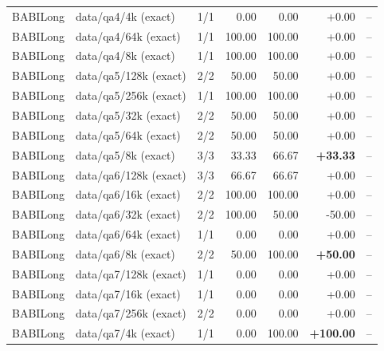 \begin{longtable}{lp{3.1cm}rrrrr}
BABILong & \raggedright data/\allowbreak qa4/\allowbreak 4k {\tiny (exact)} & 1/1 & 0.00 & 0.00 & +0.00 & -- \\
BABILong & \raggedright data/\allowbreak qa4/\allowbreak 64k {\tiny (exact)} & 1/1 & 100.00 & 100.00 & +0.00 & -- \\
BABILong & \raggedright data/\allowbreak qa4/\allowbreak 8k {\tiny (exact)} & 1/1 & 100.00 & 100.00 & +0.00 & -- \\
BABILong & \raggedright data/\allowbreak qa5/\allowbreak 128k {\tiny (exact)} & 2/2 & 50.00 & 50.00 & +0.00 & -- \\
BABILong & \raggedright data/\allowbreak qa5/\allowbreak 256k {\tiny (exact)} & 1/1 & 100.00 & 100.00 & +0.00 & -- \\
BABILong & \raggedright data/\allowbreak qa5/\allowbreak 32k {\tiny (exact)} & 2/2 & 50.00 & 50.00 & +0.00 & -- \\
BABILong & \raggedright data/\allowbreak qa5/\allowbreak 64k {\tiny (exact)} & 2/2 & 50.00 & 50.00 & +0.00 & -- \\
BABILong & \raggedright data/\allowbreak qa5/\allowbreak 8k {\tiny (exact)} & 3/3 & 33.33 & 66.67 & \textbf{+33.33} & -- \\
BABILong & \raggedright data/\allowbreak qa6/\allowbreak 128k {\tiny (exact)} & 3/3 & 66.67 & 66.67 & +0.00 & -- \\
BABILong & \raggedright data/\allowbreak qa6/\allowbreak 16k {\tiny (exact)} & 2/2 & 100.00 & 100.00 & +0.00 & -- \\
BABILong & \raggedright data/\allowbreak qa6/\allowbreak 32k {\tiny (exact)} & 2/2 & 100.00 & 50.00 & -50.00 & -- \\
BABILong & \raggedright data/\allowbreak qa6/\allowbreak 64k {\tiny (exact)} & 1/1 & 0.00 & 0.00 & +0.00 & -- \\
BABILong & \raggedright data/\allowbreak qa6/\allowbreak 8k {\tiny (exact)} & 2/2 & 50.00 & 100.00 & \textbf{+50.00} & -- \\
BABILong & \raggedright data/\allowbreak qa7/\allowbreak 128k {\tiny (exact)} & 1/1 & 0.00 & 0.00 & +0.00 & -- \\
BABILong & \raggedright data/\allowbreak qa7/\allowbreak 16k {\tiny (exact)} & 1/1 & 0.00 & 0.00 & +0.00 & -- \\
BABILong & \raggedright data/\allowbreak qa7/\allowbreak 256k {\tiny (exact)} & 2/2 & 0.00 & 0.00 & +0.00 & -- \\
BABILong & \raggedright data/\allowbreak qa7/\allowbreak 4k {\tiny (exact)} & 1/1 & 0.00 & 100.00 & \textbf{+100.00} & -- \\

\end{longtable}
